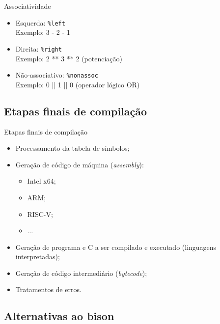 \begin{frame}{Associatividade}

  \begin{itemize}
    \item Esquerda: {\tt \%left}\\
      Exemplo: 3 - 2 - 1
     \bigskip
    \item Direita:  {\tt \%right}\\
     Exemplo: 2  ** 3 ** 2 \hfil (potenciação)
     \bigskip
    \item Não-associativo: {\tt \%nonassoc}\\
      Exemplo: 0 || 1 || 0  \hfil (operador lógico OR)
  \end{itemize}
\end{frame}

\subsection{Etapas finais de compilação}
\frame{\tableofcontents[currentsubsection]}

\begin{frame}{Etapas finais de compilação}

  \begin{itemize}
  \item Processamento da tabela de símbolos;
  \item Geração de código de máquina ({\it assembly}):
    \begin{itemize}
    \item Intel x64;
    \item ARM;
    \item RISC-V;
    \item $\ldots$
    \end{itemize}
  \item Geração de programa e C a ser compilado e executado
    (linguagens interpretadas);
  \item Geração de código intermediário ({\it bytecode});
  \item Tratamentos de erros.
  \end{itemize}
\end{frame}

\subsection{Alternativas ao bison}
\frame{\tableofcontents[currentsubsection]}

